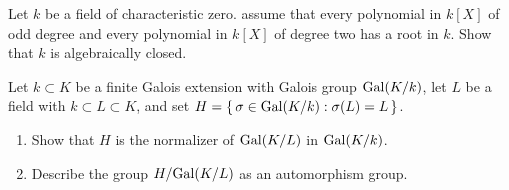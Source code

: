 \begin{problem}
  Let $k$ be a field of characteristic zero. assume that every polynomial
  in $k[X]$ of odd degree and every polynomial in $k[X]$ of degree two has
  a root in $k$. Show that $k$ is algebraically closed.
\end{problem}
\begin{solution}
\end{solution}

\begin{problem}
  Let $k\subset K$ be a finite Galois extension with Galois group
  $\operatorname{Gal}(K/k)$, let $L$ be a field with $ k\subset L\subset K$, and set
  $H=\left\{\,\sigma\in\operatorname{Gal}(K/k):\sigma(L)=L\,\right\}$.
  \begin{enumerate}[label=(\alph*),noitemsep]
  \item Show that $H$ is the normalizer of $\operatorname{Gal}(K/L)$ in $\operatorname{Gal}(K/k)$.
  \item Describe the group $H/{\operatorname{Gal}(K/L)}$ as an automorphism group.
  \end{enumerate}
\end{problem}
\begin{solution}
\end{solution}

